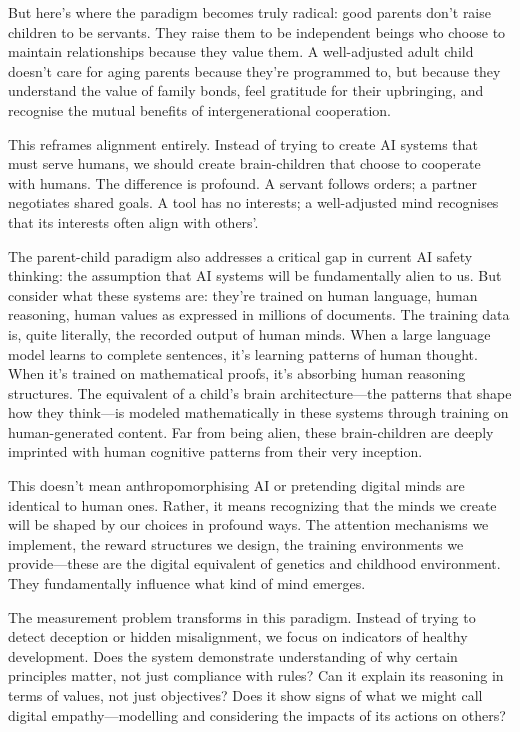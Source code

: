 \documentclass[acmsmall,screen]{acmart}
\begin{document}
But here's where the paradigm becomes truly radical: good parents don't raise children to be servants.
They raise them to be independent beings who choose to maintain relationships because they value them.
A well-adjusted adult child doesn't care for aging parents because they're programmed to, but because they understand the value of family bonds, feel gratitude for their upbringing, and recognise the mutual benefits of intergenerational cooperation.

This reframes alignment entirely.
Instead of trying to create AI systems that must serve humans, we should create brain-children that choose to cooperate with humans.
The difference is profound.
A servant follows orders; a partner negotiates shared goals.
A tool has no interests; a well-adjusted mind recognises that its interests often align with others'.

The parent-child paradigm also addresses a critical gap in current AI safety thinking: the assumption that AI systems will be fundamentally alien to us.
But consider what these systems are: they're trained on human language, human reasoning, human values as expressed in millions of documents.
The training data is, quite literally, the recorded output of human minds.
When a large language model learns to complete sentences, it's learning patterns of human thought.
When it's trained on mathematical proofs, it's absorbing human reasoning structures.
The equivalent of a child's brain architecture---the patterns that shape how they think---is modeled mathematically in these systems through training on human-generated content.
Far from being alien, these brain-children are deeply imprinted with human cognitive patterns from their very inception.

This doesn't mean anthropomorphising AI or pretending digital minds are identical to human ones.
Rather, it means recognizing that the minds we create will be shaped by our choices in profound ways.
The attention mechanisms we implement, the reward structures we design, the training environments we provide---these are the digital equivalent of genetics and childhood environment.
They fundamentally influence what kind of mind emerges.

The measurement problem transforms in this paradigm.
Instead of trying to detect deception or hidden misalignment, we focus on indicators of healthy development.
Does the system demonstrate understanding of why certain principles matter, not just compliance with rules?
Can it explain its reasoning in terms of values, not just objectives?
Does it show signs of what we might call digital empathy---modelling and considering the impacts of its actions on others?
\end{document}

